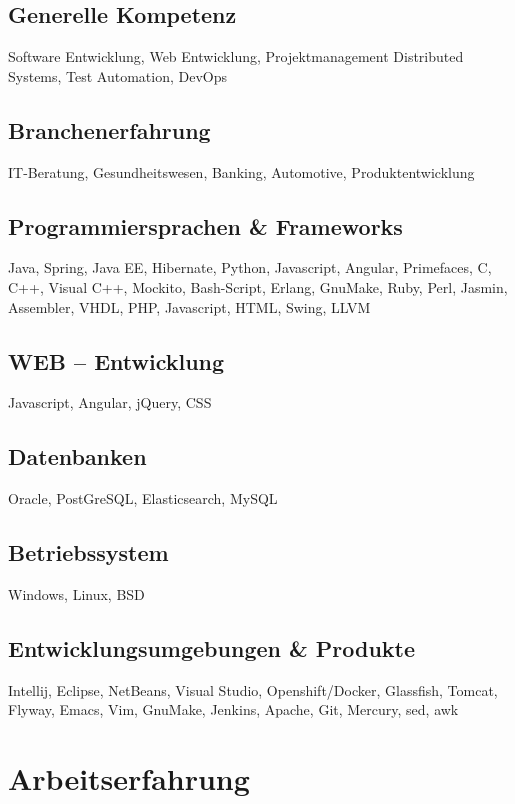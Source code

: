 \documentclass[fontsize=10pt]{tccv}
\begin{document}
\subsection{Generelle Kompetenz}
Software Entwicklung,
Web Entwicklung,
Projektmanagement
Distributed Systems,
Test Automation,
DevOps

\subsection{Branchenerfahrung}
IT-Beratung,
Gesundheitswesen,
Banking,
Automotive,
Produktentwicklung

\subsection{Programmiersprachen \& Frameworks}
Java, Spring, Java EE, Hibernate, Python, Javascript, Angular, Primefaces, C, C++, Visual C++,
Mockito, Bash-Script, Erlang, GnuMake, Ruby, Perl, Jasmin,
Assembler, VHDL, PHP, Javascript, HTML, Swing, LLVM

\subsection{WEB – Entwicklung}
Javascript, Angular, jQuery, CSS


\subsection{Datenbanken}
Oracle, PostGreSQL, Elasticsearch, MySQL

\subsection{Betriebssystem}
Windows, Linux, BSD

\subsection{Entwicklungsumgebungen \& Produkte}
Intellij, Eclipse, NetBeans, Visual Studio, Openshift/Docker, Glassfish, Tomcat, Flyway,  Emacs, Vim, GnuMake,
Jenkins, Apache, Git, Mercury, sed, awk

\newpage

\section{Arbeitserfahrung}
\end{document}
